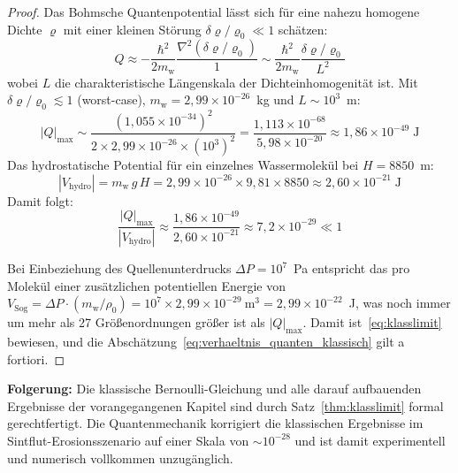 ﻿\documentclass[12pt,a4paper]{report}
\begin{document}
\begin{proof}
	Das Bohmsche Quantenpotential lässt sich für eine nahezu homogene Dichte $\varrho$ mit einer kleinen Störung $\delta\varrho/\varrho_0 \ll 1$ schätzen:
	\begin{equation}
		Q \approx -\frac{\hbar^2}{2m_\mathrm{w}}\frac{\nabla^2(\delta\varrho/\varrho_0)}{1} \sim \frac{\hbar^2}{2m_\mathrm{w}}\frac{\delta\varrho/\varrho_0}{L^2}
		\label{eq:Q_abschaetzung}
	\end{equation}
	wobei $L$ die charakteristische Längenskala der Dichteinhomogenität ist. Mit $\delta\varrho/\varrho_0 \lesssim 1$ (worst-case), $m_\mathrm{w} = 2{,}99\times10^{-26}$~kg und $L \sim 10^3$~m:
	\begin{equation}
		|Q|_\mathrm{max} \sim \frac{(1{,}055\times10^{-34})^2}{2\times2{,}99\times10^{-26}\times(10^3)^2} = \frac{1{,}113\times10^{-68}}{5{,}98\times10^{-20}} \approx 1{,}86\times10^{-49}\;\text{J}
		\label{eq:Q_numerisch}
	\end{equation}
	Das hydrostatische Potential für ein einzelnes Wassermolekül bei $H = 8850$~m:
	\begin{equation}
		|V_\mathrm{hydro}| = m_\mathrm{w}\,g\,H = 2{,}99\times10^{-26}\times9{,}81\times8850 \approx 2{,}60\times10^{-21}\;\text{J}
		\label{eq:V_hydro_numerisch}
	\end{equation}
	Damit folgt:
	\begin{equation}
		\frac{|Q|_\mathrm{max}}{|V_\mathrm{hydro}|} \approx \frac{1{,}86\times10^{-49}}{2{,}60\times10^{-21}} \approx 7{,}2\times10^{-29} \ll 1
		\label{eq:verhaeltnis_explizit}
	\end{equation}
	
	Bei Einbeziehung des Quellenunterdrucks $\Delta P = 10^7$~Pa entspricht das pro Molekül einer zusätzlichen potentiellen Energie von $V_\mathrm{Sog} = \Delta P \cdot (m_\mathrm{w}/\rho_0) = 10^7 \times 2{,}99\times10^{-29}~\text{m}^3 = 2{,}99\times10^{-22}$~J, was noch immer um mehr als 27 Größenordnungen größer ist als $|Q|_\mathrm{max}$. Damit ist~\eqref{eq:klasslimit} bewiesen, und die Abschätzung~\eqref{eq:verhaeltnis_quanten_klassisch} gilt a fortiori.
\end{proof}

\textbf{Folgerung:} Die klassische Bernoulli-Gleichung und alle darauf aufbauenden Ergebnisse der vorangegangenen Kapitel sind durch Satz~\ref{thm:klasslimit} formal gerechtfertigt. Die Quantenmechanik korrigiert die klassischen Ergebnisse im Sintflut-Erosionsszenario auf einer Skala von $\sim 10^{-28}$ und ist damit experimentell und numerisch vollkommen unzugänglich.
\end{document}
